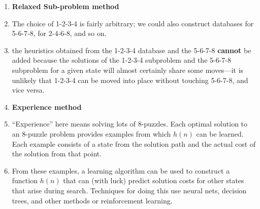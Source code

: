 \begin{enumerate}[itemsep=0.2cm]
    \item[] \textbf{Relaxed Sub-problem method}
    
    \item The choice of 1-2-3-4 is fairly arbitrary; we could also construct databases for 5-6-7-8, for 2-4-6-8, and so on.
    \hfill \cite{ai/book/Artificial-Intelligence-A-Modern-Approach/Russell-Norvig}

    \item the heuristics obtained from the 1-2-3-4 database and the 5-6-7-8 \textbf{cannot} be added
     because the solutions of the 1-2-3-4 subproblem and the 5-6-7-8 subproblem for a given state will almost certainly share some moves—it is unlikely that 1-2-3-4 can be moved into place without touching 5-6-7-8, and vice versa. 
    \hfill \cite{ai/book/Artificial-Intelligence-A-Modern-Approach/Russell-Norvig}

    \item[] \textbf{Experience method}

    \item “Experience” here means solving lots of $8$-puzzles. 
    Each optimal solution to an 8-puzzle problem provides examples from which $h(n)$ can be learned. 
    Each example consists of a state from the solution path and the actual cost of the solution from that point.
    \hfill \cite{ai/book/Artificial-Intelligence-A-Modern-Approach/Russell-Norvig}

    \item From these examples, a learning algorithm can be used to construct a function $h(n)$ that can (with luck) predict solution costs for other states that arise during search. 
    Techniques for doing this use neural nets, decision trees, and other methods or reinforcement learning.
    \hfill \cite{ai/book/Artificial-Intelligence-A-Modern-Approach/Russell-Norvig}
\end{enumerate}
















